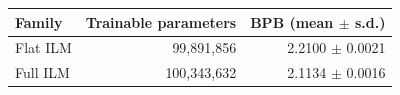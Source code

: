 \begin{tabular}{lrr}
\toprule
Family & Trainable parameters & BPB (mean $\pm$ s.d.) \\
\midrule
Flat ILM & 99,891,856 & 2.2100 $\pm$ 0.0021 \\
Full ILM & 100,343,632 & 2.1134 $\pm$ 0.0016 \\
\bottomrule
\end{tabular}
